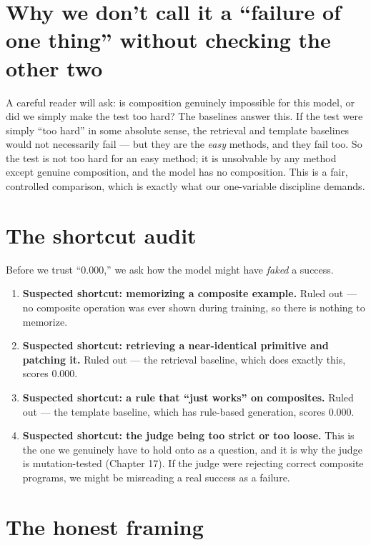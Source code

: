 \section{Why we don't call it a ``failure of one thing'' without
checking the other
two}\label{why-we-dont-call-it-a-failure-of-one-thing-without-checking-the-other-two}

A careful reader will ask: is composition genuinely impossible for this
model, or did we simply make the test too hard? The baselines answer
this. If the test were simply ``too hard'' in some absolute sense, the
retrieval and template baselines would not necessarily fail --- but they
are the \emph{easy} methods, and they fail too. So the test is not too
hard for an easy method; it is unsolvable by any method except genuine
composition, and the model has no composition. This is a fair,
controlled comparison, which is exactly what our one-variable discipline
demands.

\section{The shortcut audit}\label{the-shortcut-audit}

Before we trust ``0.000,'' we ask how the model might have \emph{faked}
a success.

\begin{enumerate}
\def\labelenumi{\arabic{enumi}.}
\tightlist
\item
  \textbf{Suspected shortcut: memorizing a composite example.} Ruled out
  --- no composite operation was ever shown during training, so there is
  nothing to memorize.
\item
  \textbf{Suspected shortcut: retrieving a near-identical primitive and
  patching it.} Ruled out --- the retrieval baseline, which does exactly
  this, scores 0.000.
\item
  \textbf{Suspected shortcut: a rule that ``just works'' on composites.}
  Ruled out --- the template baseline, which has rule-based generation,
  scores 0.000.
\item
  \textbf{Suspected shortcut: the judge being too strict or too loose.}
  This is the one we genuinely have to hold onto as a question, and it
  is why the judge is mutation-tested (Chapter 17). If the judge were
  rejecting correct composite programs, we might be misreading a real
  success as a failure.
\end{enumerate}

\section{The honest framing}\label{the-honest-framing}

